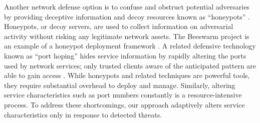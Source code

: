 Another network defense option is to confuse and obstruct potential adversaries by providing deceptive information and decoy resources known as ``honeypots'' \cite{spitzner2003honeypots}. Honeypots, or 
decoy servers, are used to collect information on adversarial activity without risking any legitimate network assets. The Beeswarm project is an example of a honeypot deployment framework \cite{beeswarm}. 
A related defensive technology known as ``port hoping'' hides service information by rapidly altering the ports used by network services; only trusted clients aware of the anticipated pattern are able to 
gain access \cite{portHopping}. While honeypots and related techniques are powerful tools, they require substantial overhead to deploy and manage. Similarly, altering service characteristics such as port 
numbers constantly is a resource-intensive process. To address these shortcomings, our approach adaptively alters service characteristics only in response to detected threats.


